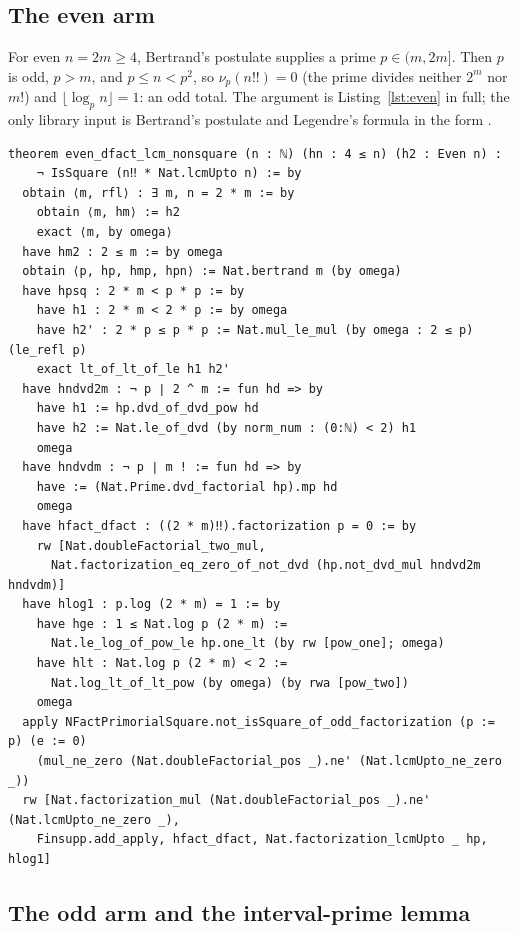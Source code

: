 \documentclass[11pt]{article}
\theoremstyle{definition}
\begin{document}
\subsection{The even arm}

For even $n = 2m \ge 4$, Bertrand's postulate supplies a prime
$p \in (m, 2m]$. Then $p$ is odd, $p > m$, and $p \le n < p^2$, so
$\nu_p(n!!) = 0$ (the prime divides neither $2^m$ nor $m!$) and
$\lfloor \log_p n \rfloor = 1$: an odd total. The argument is
Listing~\ref{lst:even} in full; the only library input is Bertrand's
postulate and Legendre's formula in the form
.

\begin{lstlisting}[caption={The even arm in full: even $n \ge 4$ are excluded by
Bertrand's postulate.},label={lst:even}]
theorem even_dfact_lcm_nonsquare (n : ℕ) (hn : 4 ≤ n) (h2 : Even n) :
    ¬ IsSquare (n‼ * Nat.lcmUpto n) := by
  obtain ⟨m, rfl⟩ : ∃ m, n = 2 * m := by
    obtain ⟨m, hm⟩ := h2
    exact ⟨m, by omega⟩
  have hm2 : 2 ≤ m := by omega
  obtain ⟨p, hp, hmp, hpn⟩ := Nat.bertrand m (by omega)
  have hpsq : 2 * m < p * p := by
    have h1 : 2 * m < 2 * p := by omega
    have h2' : 2 * p ≤ p * p := Nat.mul_le_mul (by omega : 2 ≤ p) (le_refl p)
    exact lt_of_lt_of_le h1 h2'
  have hndvd2m : ¬ p ∣ 2 ^ m := fun hd => by
    have h1 := hp.dvd_of_dvd_pow hd
    have h2 := Nat.le_of_dvd (by norm_num : (0:ℕ) < 2) h1
    omega
  have hndvdm : ¬ p ∣ m ! := fun hd => by
    have := (Nat.Prime.dvd_factorial hp).mp hd
    omega
  have hfact_dfact : ((2 * m)‼).factorization p = 0 := by
    rw [Nat.doubleFactorial_two_mul,
      Nat.factorization_eq_zero_of_not_dvd (hp.not_dvd_mul hndvd2m hndvdm)]
  have hlog1 : p.log (2 * m) = 1 := by
    have hge : 1 ≤ Nat.log p (2 * m) :=
      Nat.le_log_of_pow_le hp.one_lt (by rw [pow_one]; omega)
    have hlt : Nat.log p (2 * m) < 2 :=
      Nat.log_lt_of_lt_pow (by omega) (by rwa [pow_two])
    omega
  apply NFactPrimorialSquare.not_isSquare_of_odd_factorization (p := p) (e := 0)
    (mul_ne_zero (Nat.doubleFactorial_pos _).ne' (Nat.lcmUpto_ne_zero _))
  rw [Nat.factorization_mul (Nat.doubleFactorial_pos _).ne' (Nat.lcmUpto_ne_zero _),
    Finsupp.add_apply, hfact_dfact, Nat.factorization_lcmUpto _ hp, hlog1]
\end{lstlisting}

\subsection{The odd arm and the interval-prime lemma}
\end{document}

